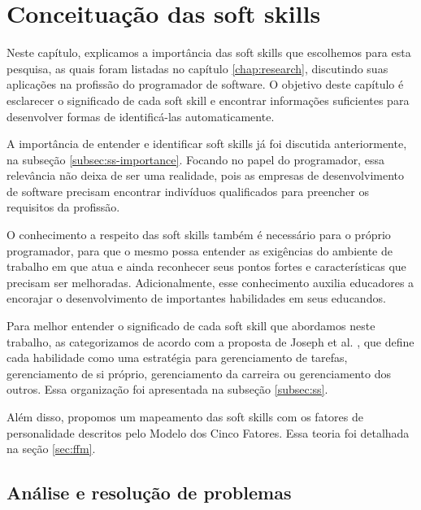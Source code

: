 

\chapter{Conceituação das soft skills}

\label{chap:concepts}

Neste capítulo, explicamos a importância das soft skills que escolhemos para esta pesquisa, as quais foram listadas no capítulo \ref{chap:research}, discutindo suas aplicações na profissão do programador de software. O objetivo deste capítulo é esclarecer o significado de cada soft skill e encontrar informações suficientes para desenvolver formas de identificá-las automaticamente.

A importância de entender e identificar soft skills já foi discutida anteriormente, na subseção \ref{subsec:ss-importance}. Focando no papel do programador, essa relevância não deixa de ser uma realidade, pois as empresas de desenvolvimento de software precisam encontrar indivíduos qualificados para preencher os requisitos da profissão.

O conhecimento a respeito das soft skills também é necessário para o próprio programador, para que o mesmo possa entender as exigências do ambiente de trabalho em que atua e ainda reconhecer seus pontos fortes e características que precisam ser melhoradas. Adicionalmente, esse conhecimento auxilia educadores a encorajar o desenvolvimento de importantes habilidades em seus educandos.

Para melhor entender o significado de cada soft skill que abordamos neste trabalho, as categorizamos de acordo com a proposta de Joseph et al. \cite{joseph:99, joseph:10}, que define cada habilidade como uma estratégia para gerenciamento de tarefas, gerenciamento de si próprio, gerenciamento da carreira ou gerenciamento dos outros. Essa organização foi apresentada na subseção \ref{subsec:ss}.

Além disso, propomos um mapeamento das soft skills com os fatores de personalidade descritos pelo Modelo dos Cinco Fatores. Essa teoria foi detalhada na seção \ref{sec:ffm}.

\section{Análise e resolução de problemas}

